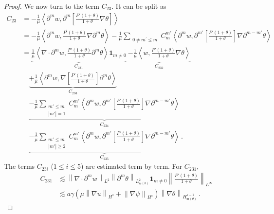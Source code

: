 \documentclass[reqno,11pt]{amsart}
\numberwithin{equation}{section}
\def\no{\nonumber}
\def\w{\mathfrak{w}}
\begin{document}
\begin{proof}
We now turn to the term $C_{23}$. It can be split as
\begin{align}\label{gpsi-eq11}
\no C_{23}&=-\frac{1}{\mu} \left\langle \partial^m w, \partial^m \left[ \frac{P'(1+\theta)}{1+\theta} \nabla \theta \right] \right\rangle\\
\no & = -\frac{1}{\mu} \left\langle \partial^m w, \frac{P^\prime(1+\theta)}{1+\theta} \nabla \partial^m \theta \right\rangle -\frac{1}{\mu} \sum_{\substack{0\neq m^\prime \leq m}} C_m^{m'} \left\langle \partial^m w, \partial^{m'} \left[\frac{P'(1+\theta)}{1+\theta}\right] \nabla \partial^{m-m'} \theta \right\rangle \\
\no &= \underset{C_{231}}{\underbrace{\frac{1}{\mu} \left\langle \nabla \cdot \partial^m w, \frac{P'(1+\theta)}{1+\theta} \partial^m \theta \right\rangle {\mathbf{1}}_{m\neq 0} }} \ \underset{C_{232}}{\underbrace{ -\frac{1}{\mu} \left\langle w, \frac{P'(1+\theta)}{1+\theta} \nabla \theta \right\rangle}} \quad  \\
\no & \quad \underset{C_{233}}{\underbrace{+\frac{1}{\mu} \left\langle \partial^m w, \nabla \left[\frac{P'(1+\theta)}{1+\theta}\right] \partial^m \theta \right\rangle }} \\
\no &\quad \underset{C_{234}}{\underbrace{-\frac{1}{\mu} \sum_{\substack{m' \leq m \\ |m'| = 1}} C_m^{m'} \left\langle \partial^m w, \partial^{m'} \left[\frac{P'(1+\theta)}{1+\theta}\right] \nabla \partial^{m-m'} \theta \right\rangle}} \\
& \quad \underset{C_{235}}{\underbrace{ -\frac{1}{\mu} \sum_{\substack{m' \leq m \\ |m'| \geq 2}} C_m^{m'} \left\langle \partial^m w, \partial^{m'} \left[\frac{P'(1+\theta)}{1+\theta}\right] \nabla \partial^{m-m'} \theta \right\rangle}} \,.
\end{align}
The terms $C_{23i}$ ($1 \le i \le 5$) are estimated term by term. For $C_{231}$,
\begin{equation}\label{gpsi-eq12}
\begin{aligned}
C_{231} & \lesssim \left\| \nabla \cdot \partial^m w \right\|_{L^2} \left\| \partial^m \theta \right\|_{L^2_{\w (\theta)}}\mathbf{1}_{m\neq 0} \left\| \frac{P'(1+\theta)}{1+\theta} \right\|_{L^\infty} \\
& \lesssim a \gamma \left( \mu \left\| \nabla u \right\|_{H^s} + \left\| \nabla \psi \right\|_{H^s} \right) \left\| \nabla \theta \right\|_{H^{s-1}_{\w (\theta)}} \,.
\end{aligned}
\end{equation}

\end{proof}
\end{document}
